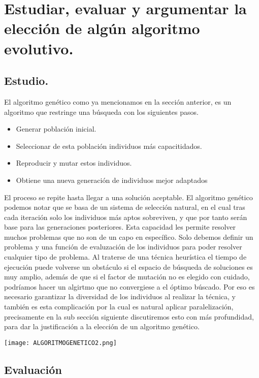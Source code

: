 \documentclass{article}
\begin{document}
\section{Estudiar, evaluar y argumentar la elección de algún algoritmo evolutivo.}
\subsection{Estudio.}
El algoritmo genético como ya mencionamos en la sección anterior, es un algoritmo que restringe una búsqueda con los siguientes pasos.
\begin{itemize}
    \item Generar población inicial.
    \item Seleccionar de esta población individuos más capacitidados.
    \item Reproducir y mutar estos individuos.
    \item Obtiene una nueva generación de individuos mejor adaptados
    
\end{itemize}
El proceso se repite hasta llegar a una solución aceptable.
El algoritmo genético podemos notar que se basa de un sistema de selección natural, en el cual tras cada iteración solo los individuos más aptos sobreviven, y que por tanto serán base para las generaciones posteriores.
Esta capacidad les permite resolver muchos problemas que no son de un capo en específico. Solo debemos definir un problema y una función de evaluzación de los individuos para poder resolver cualquier tipo de problema. Al traterse de una técnica heurística el tiempo de ejecución puede volverse un obstáculo si el espacio de búsqueda de soluciones es muy amplio, además de que si el factor de mutación no es elegido con cuidado, podríamos hacer un algirtmo que no convergiese a el óptimo búscado. Por eso es necesario garantizar la diversidad de los individuos al realizar la técnica, y también es esta complicación por la cual es natural aplicar paralelización, precisamente en la sub sección siguiente discutiremos esto con más profundidad, para dar la justificación a la elección de un algoritmo genético.

\begin{center}
    \texttt{[image: ALGORITMOGENETICO2.png]}
\end{center}


\subsection{Evaluación}
\end{document}
